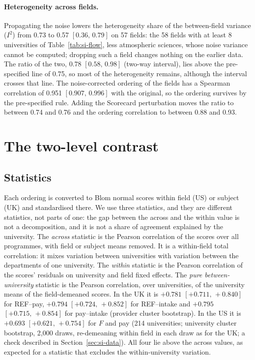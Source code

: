 \documentclass[11pt]{article}
\newcommand{\ci}[2]{$[#1,\allowbreak\,#2]$}
\begin{document}
\paragraph{Heterogeneity across fields.} Propagating the noise lowers the heterogeneity share of the
between-field variance ($I^2$) from 0.73 to 0.57 \ci{0.36}{0.79} on 57 fields: the 58 fields with at least 8
universities of Table~\ref{tab:si-flow}, less atmospheric sciences, whose noise variance cannot be computed;
dropping such a field changes nothing on the earlier data. The ratio of the two, 0.78 \ci{0.58}{0.98}
(two-way interval), lies above the pre-specified line of 0.75, so most of the heterogeneity remains, although the
interval crosses that line. The noise-corrected ordering of the fields has a Spearman correlation of 0.951
\ci{0.907}{0.996} with the original, so the ordering survives by the pre-specified rule. Adding the Scorecard
perturbation moves the ratio to between 0.74 and 0.76 and the ordering correlation to between 0.88 and 0.93.

\section{The two-level contrast}\label{sec:si-contrast}

\subsection{Statistics}

Each ordering is converted to Blom normal scores within field (US) or subject (UK) and standardised there. We use
three statistics, and they are different statistics, not parts of one: the gap between the across and the within
value is not a decomposition, and it is not a share of agreement explained by the university. The \emph{across}
statistic is the Pearson correlation of the scores over all programmes, with field or subject means removed. It is a
within-field total correlation: it mixes variation between universities with variation between the departments of one
university. The \emph{within} statistic is the Pearson correlation of the scores' residuals on university and field
fixed effects. The \emph{pure between-university} statistic is the Pearson correlation, over universities, of the
university means of the field-demeaned scores. In the UK it is $+0.781$ \ci{+0.711}{+0.840} for REF--pay, $+0.794$
\ci{+0.724}{+0.852} for REF--intake and $+0.795$ \ci{+0.715}{+0.854} for pay--intake (provider cluster bootstrap). In
the US it is $+0.693$ \ci{+0.621}{+0.754} for $F$ and pay (214 universities; university cluster bootstrap, 2,000
draws, re-demeaning within field in each draw as for the UK; a check described in Section~\ref{sec:si-data}). All
four lie above the across values, as expected for a statistic that excludes the within-university variation.
\end{document}
